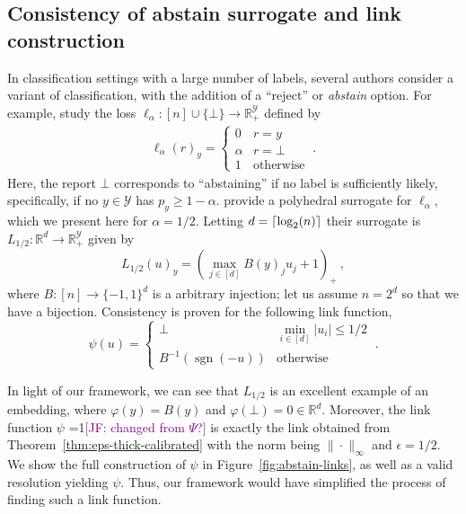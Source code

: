 \documentclass[12pt]{article}
\newcommand{\Comments}{1}
\newcommand{\mynote}[2]{\ifnum\Comments=1\textcolor{#1}{#2}\fi}
\newcommand{\jessie}[1]{\mynote{purple}{[JF: #1]}}
\newcommand{\reals}{\mathbb{R}}
\newcommand{\Y}{\mathcal{Y}}
\DeclarePairedDelimiter\ceil{\lceil}{\rceil}
\newcommand{\ellabs}[1]{\ell_{#1}}
\DeclareMathOperator*{\sgn}{sgn}
\begin{document}
\subsection{Consistency of abstain surrogate and link construction}
\label{sec:abstain}

In classification settings with a large number of labels, several authors consider a variant of classification, with the addition of a ``reject'' or \emph{abstain} option.
For example, \citet{ramaswamy2018consistent} study the loss $\ellabs{\alpha} : [n] \cup \{\bot\} \to \reals^\Y_+$ defined by
\begin{align}\label{eq:abstain-discrete}
\ellabs{\alpha}(r)_y = \begin{cases}
0 & r = y\\
\alpha & r = \bot\\
1 & \text{otherwise}
\end{cases}~.
\end{align}
Here, the report $\bot$ corresponds to ``abstaining'' if no label is sufficiently likely, specifically, if no $y\in\Y$ has $p_y \geq 1-\alpha$.
\citet{ramaswamy2018consistent} provide a polyhedral surrogate for $\ellabs{\alpha}$, which we present here for $\alpha=1/2$.
Letting $d = \ceil{\log_2(n)}$ their surrogate is $L_{1/2} : \reals^d \to \reals^\Y_+$ given by
\begin{equation}\label{eq:abstain-surrogate}
L_{1/2}(u)_y = \left(\max_{j \in [d]}B(y)_j u_j + 1\right)_+~,
\end{equation}
where $B:[n]\to\{-1,1\}^d$ is a arbitrary injection; let us assume $n = 2^d$ so that we have a bijection.
Consistency is proven for the following link function,
\begin{equation}\label{eq:abstain-link}
  \psi(u) = \begin{cases}
	\bot & \min_{i \in [d]} |u_i| \leq 1/2\\
	B^{-1}(\sgn(-u)) &\text{otherwise}
  \end{cases}~.
\end{equation}

In light of our framework, we can see that $L_{1/2}$ is an excellent example of an embedding, where $\varphi(y) = B(y)$ and $\varphi(\bot) = 0 \in \reals^d$.
Moreover, the link function $\psi$ \jessie{changed from $\Psi$?} is exactly the link obtained from Theorem~\ref{thm:eps-thick-calibrated} with the norm being $\|\cdot\|_\infty$ and $\epsilon=1/2$.
We show the full construction of $\psi$ in Figure~\ref{fig:abstain-links}, as well as a valid resolution yielding $\psi$.
Thus, our framework would have simplified the process of finding such a link function.
\end{document}
